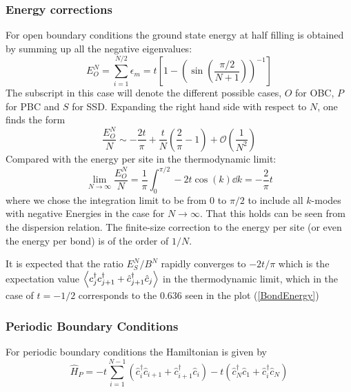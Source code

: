 \documentclass[11pt, a4paper]{article}
\theoremstyle{definition} %
\begin{document}
\subsubsection{Energy corrections}

For open boundary conditions the ground state energy at half filling is obtained by summing up all the negative eigenvalues:
\begin{equation}
	E_O^{N} = \sum_{i = 1}^{N/2} \epsilon_m = t\left[1 - \left(\sin(\frac{\pi/2}{N+1}) \right)^{-1} \right]
\end{equation}
The subscript in this case will denote the different possible cases, $O$ for OBC, $P$ for PBC and $S$ for SSD.
Expanding the right hand side with respect to $N$, one finds the form
\begin{equation}
	\frac{E_O^N}{N} \sim - \frac{2 t}{\pi} + \frac{t}{N}\left( \frac{2}{\pi} - 1\right) + \mathcal{O}\left(\frac{1}{N^2}\right)
\end{equation}
Compared with the energy per site in the thermodynamic limit:
\begin{equation}
	\lim_{N \rightarrow \infty} \frac{E_O^N}{N} = \frac{1}{\pi} \int_{0}^{\pi/2} -2t \cos(k) \dd k = - \frac{2}{\pi} t 
\end{equation}
where we chose the integration limit to be from 0 to $\pi/2$ to include all $k$-modes with negative Energies in the case for $N \rightarrow \infty$. That this holds can be seen from the dispersion relation. The finite-size correction to the energy per site (or even the energy per bond) is of the order of $1/N$.


It is expected that the ratio $E_S^N/ B^N$ rapidly converges to $-2t/\pi$ which is the expectation value $\expval{c_j^\dagger c_{j+1}^\dagger + \hat{c}_{j+1}^\dagger \hat{c}_j}$ in the thermodynamic limit, which in the case of $t = -1/2$ corresponds to the $0.636$ seen in the plot (\ref{BondEnergy}) 
%	



\subsubsection{Periodic Boundary Conditions}
For periodic boundary conditions the Hamiltonian is given by
\begin{equation}
	\hat{H}_P = -t\sum_{i=1}^{N-1} \left( \hat{c}_i^\dagger\hat{c}_{i+1} + \hat{c}^\dagger_{i+1} \hat{c}_i\right) - t\left(\hat{c}_N^\dagger \hat{c}_1 + \hat{c}_i^\dagger \hat{c}_N\right)
\end{equation}
\end{document}
